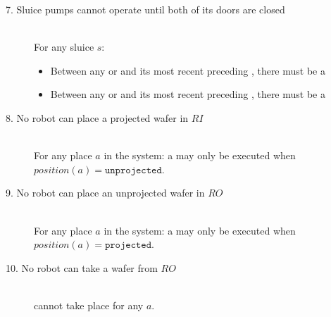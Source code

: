 \begin{description}
 \item[7. Sluice pumps cannot operate until both of its doors are closed] \hfill \\
 For any sluice $s$:
 \begin{itemize}
  \item Between any  or  and its most recent preceding , there must be a 
  \item Between any  or  and its most recent preceding , there must be a 
 \end{itemize}

\item[8. No robot can place a projected wafer in $RI$] \hfill \\
For any place $a$ in the system: a  may only be executed when $position(a) = \texttt{unprojected}$.

\item[9. No robot can place an unprojected wafer in $RO$] \hfill \\
For any place $a$ in the system: a  may only be executed when $position(a) = \texttt{projected}$.

\item[10. No robot can take a wafer from $RO$] \hfill \\
 cannot take place for any $a$.
 
\end{description}
